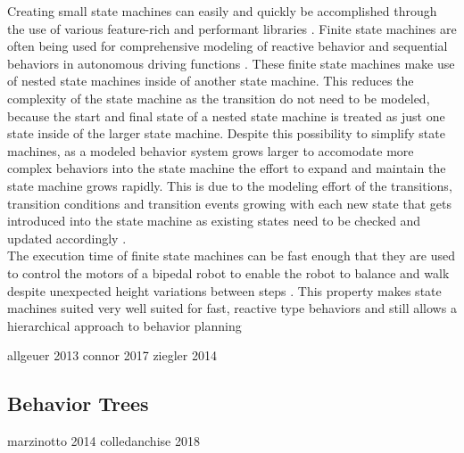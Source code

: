 Creating small state machines can easily and quickly be accomplished through the use of various feature-rich and performant libraries \cite{fourakis2014}. 
Finite state machines are often being used for comprehensive modeling of reactive behavior and sequential behaviors in autonomous driving functions \cite{ziegler2014}. These finite state machines make use of nested state machines inside of another state machine. This reduces the complexity of the state machine as the transition do not need to be modeled, because the start and final state of a nested state machine is treated as just one state inside of the larger state machine. Despite this possibility to simplify state machines, as a modeled behavior system grows larger to accomodate more complex behaviors into the state machine the effort to expand and maintain the state machine grows rapidly. This is due to the modeling effort of the transitions, transition conditions and transition events growing with each new state that gets introduced into the state machine as existing states need to be checked and updated accordingly \cite{conner2017}. \\

The execution time of finite state machines can be fast enough that they are used to control the motors of a bipedal robot to enable the robot to balance and walk despite unexpected height variations between steps \cite{park2013}. This property makes state machines suited very well suited for fast, reactive type behaviors and still allows a hierarchical approach to behavior planning 


allgeuer 2013
connor 2017
ziegler 2014

\subsection{Behavior Trees}
marzinotto 2014
colledanchise 2018



